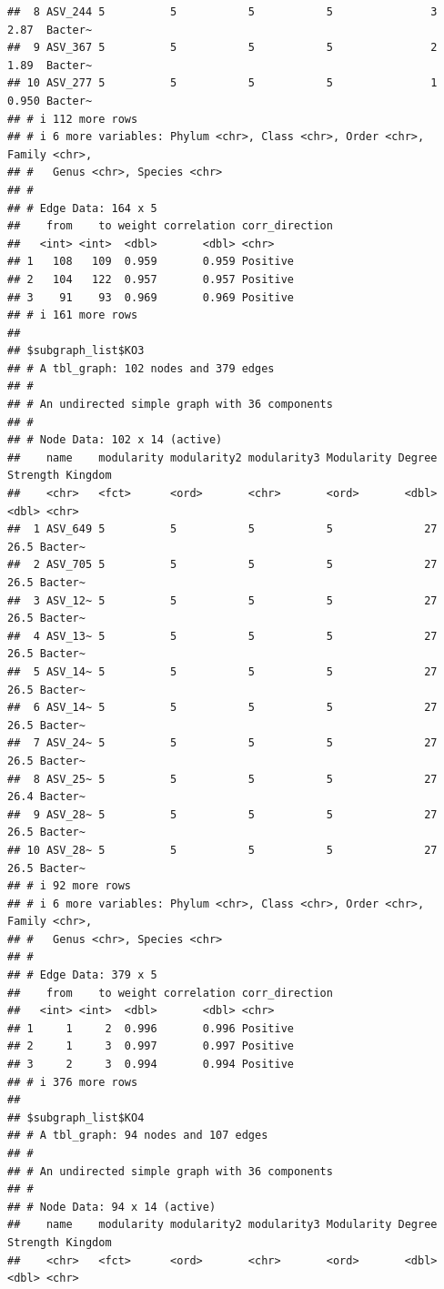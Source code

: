 \documentclass[
]{book}
\begin{document}
\begin{verbatim}
##  8 ASV_244 5          5           5           5               3    2.87  Bacter~
##  9 ASV_367 5          5           5           5               2    1.89  Bacter~
## 10 ASV_277 5          5           5           5               1    0.950 Bacter~
## # i 112 more rows
## # i 6 more variables: Phylum <chr>, Class <chr>, Order <chr>, Family <chr>,
## #   Genus <chr>, Species <chr>
## #
## # Edge Data: 164 x 5
##    from    to weight correlation corr_direction
##   <int> <int>  <dbl>       <dbl> <chr>         
## 1   108   109  0.959       0.959 Positive      
## 2   104   122  0.957       0.957 Positive      
## 3    91    93  0.969       0.969 Positive      
## # i 161 more rows
## 
## $subgraph_list$KO3
## # A tbl_graph: 102 nodes and 379 edges
## #
## # An undirected simple graph with 36 components
## #
## # Node Data: 102 x 14 (active)
##    name    modularity modularity2 modularity3 Modularity Degree Strength Kingdom
##    <chr>   <fct>      <ord>       <chr>       <ord>       <dbl>    <dbl> <chr>  
##  1 ASV_649 5          5           5           5              27     26.5 Bacter~
##  2 ASV_705 5          5           5           5              27     26.5 Bacter~
##  3 ASV_12~ 5          5           5           5              27     26.5 Bacter~
##  4 ASV_13~ 5          5           5           5              27     26.5 Bacter~
##  5 ASV_14~ 5          5           5           5              27     26.5 Bacter~
##  6 ASV_14~ 5          5           5           5              27     26.5 Bacter~
##  7 ASV_24~ 5          5           5           5              27     26.5 Bacter~
##  8 ASV_25~ 5          5           5           5              27     26.4 Bacter~
##  9 ASV_28~ 5          5           5           5              27     26.5 Bacter~
## 10 ASV_28~ 5          5           5           5              27     26.5 Bacter~
## # i 92 more rows
## # i 6 more variables: Phylum <chr>, Class <chr>, Order <chr>, Family <chr>,
## #   Genus <chr>, Species <chr>
## #
## # Edge Data: 379 x 5
##    from    to weight correlation corr_direction
##   <int> <int>  <dbl>       <dbl> <chr>         
## 1     1     2  0.996       0.996 Positive      
## 2     1     3  0.997       0.997 Positive      
## 3     2     3  0.994       0.994 Positive      
## # i 376 more rows
## 
## $subgraph_list$KO4
## # A tbl_graph: 94 nodes and 107 edges
## #
## # An undirected simple graph with 36 components
## #
## # Node Data: 94 x 14 (active)
##    name    modularity modularity2 modularity3 Modularity Degree Strength Kingdom
##    <chr>   <fct>      <ord>       <chr>       <ord>       <dbl>    <dbl> <chr>  

\end{verbatim}
\end{document}

